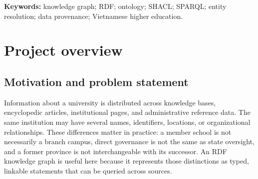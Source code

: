 \documentclass[11pt,a4paper]{article}
\begin{document}
\begin{abstract}
VN-Edu LOD is an RDF knowledge graph for Vietnamese educational institutions. The project
integrates structured Wikidata records, Vietnamese Wikipedia material, and curated reference
tables into a common model of organizations, people, academic programs, and administrative
geography. The corrected snapshot contains \metricInstitutions{} educational organizations,
\metricPeople{} people, \metricCurrentProvinces{} current and \metricFormerProvinces{}
former province-level units, and \metricPrograms{} illustrative programs. Its central
technical contribution is a staged Bronze--Silver--Gold pipeline: source snapshots are
normalized into records, records are mapped to persistent HTTP IRIs, RDF is linked and
materialized, and the resulting union is released only after structural and semantic checks.

The ontology contains \metricClasses{} local classes, \metricObjectProperties{} object
properties, and \metricDataProperties{} datatype properties. OWL 2 RL profile checking,
rule-based materialization, SHACL validation, Apache Jena Fuseki/TDB2 acceptance tests,
and regression tests provide complementary evidence. The validated serving union contains
\metricUnionTriples{} distinct triples. The report separates ontology conformance,
reference-link agreement, data completeness, factual accuracy, and production readiness:
they are related engineering goals, but none is a substitute for the others. The result is
a reproducible educational Linked Data artifact with an explicit list of remaining evidence
requirements for authoritative, high-load deployment.
\end{abstract}
\noindent\textbf{Keywords:} knowledge graph; RDF; ontology; SHACL; SPARQL; entity resolution;
data provenance; Vietnamese higher education.
\clearpage\tableofcontents\clearpage
\listoffigures\clearpage
\listoftables\clearpage

\section{Project overview}
\subsection{Motivation and problem statement}
Information about a university is distributed across knowledge bases, encyclopedic articles,
institutional pages, and administrative reference data. The same institution may have several
names, identifiers, locations, or organizational relationships. These differences matter in
practice: a member school is not necessarily a branch campus, direct governance is not the
same as state oversight, and a former province is not interchangeable with its successor.
An RDF knowledge graph is useful here because it represents those distinctions as typed,
linkable statements that can be queried across sources.
\end{document}
